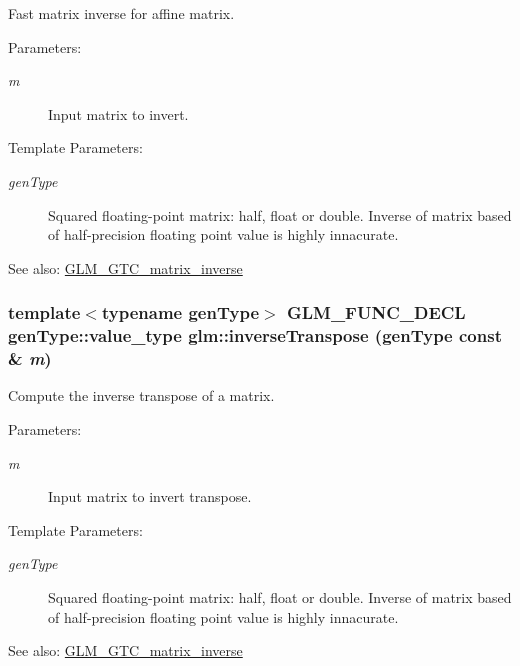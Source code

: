 Fast matrix inverse for affine matrix.

\begin{Desc}
\item[Parameters:]
\begin{description}
\item[{\em m}]Input matrix to invert. \end{description}
\end{Desc}
\begin{Desc}
\item[Template Parameters:]
\begin{description}
\item[{\em genType}]Squared floating-point matrix: half, float or double. Inverse of matrix based of half-precision floating point value is highly innacurate. \end{description}
\end{Desc}
\begin{Desc}
\item[See also:]\hyperlink{group__gtc__matrix__inverse}{GLM\_\-GTC\_\-matrix\_\-inverse} \end{Desc}
\hypertarget{group__gtc__matrix__inverse_g63a905c74c61422e84008d466f1e3c49}{
\subsubsection[inverseTranspose]{\setlength{\rightskip}{0pt plus 5cm}template$<$typename genType$>$ GLM\_\-FUNC\_\-DECL genType::value\_\-type glm::inverseTranspose (genType const \& {\em m})}}
\label{group__gtc__matrix__inverse_g63a905c74c61422e84008d466f1e3c49}


Compute the inverse transpose of a matrix.

\begin{Desc}
\item[Parameters:]
\begin{description}
\item[{\em m}]Input matrix to invert transpose. \end{description}
\end{Desc}
\begin{Desc}
\item[Template Parameters:]
\begin{description}
\item[{\em genType}]Squared floating-point matrix: half, float or double. Inverse of matrix based of half-precision floating point value is highly innacurate. \end{description}
\end{Desc}
\begin{Desc}
\item[See also:]\hyperlink{group__gtc__matrix__inverse}{GLM\_\-GTC\_\-matrix\_\-inverse} \end{Desc}
